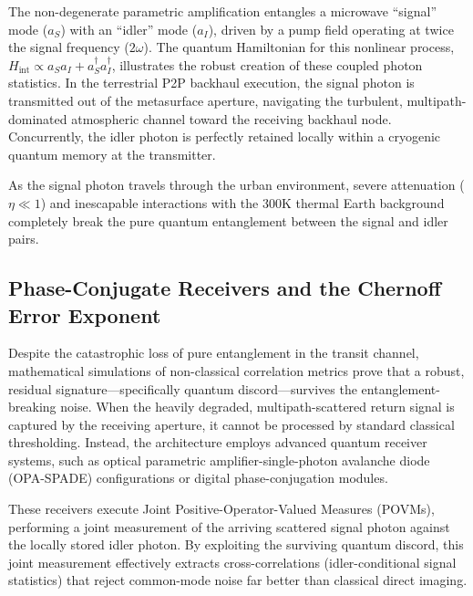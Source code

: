 \documentclass[11pt,a4paper]{article}
\begin{document}
The non-degenerate parametric amplification entangles a microwave ``signal'' mode ($a_S$) with an ``idler'' mode ($a_I$), driven by a pump field operating at twice the signal frequency ($2\omega$).\cite{ref33} The quantum Hamiltonian for this nonlinear process, $H_{\text{int}} \propto a_S a_I + a_S^\dagger a_I^\dagger$, illustrates the robust creation of these coupled photon statistics.\cite{ref33} In the terrestrial P2P backhaul execution, the signal photon is transmitted out of the metasurface aperture, navigating the turbulent, multipath-dominated atmospheric channel toward the receiving backhaul node.\cite{ref37} Concurrently, the idler photon is perfectly retained locally within a cryogenic quantum memory at the transmitter.\cite{ref36}

As the signal photon travels through the urban environment, severe attenuation ($\eta \ll 1$) and inescapable interactions with the 300K thermal Earth background completely break the pure quantum entanglement between the signal and idler pairs.\cite{ref33}

\subsection{Phase-Conjugate Receivers and the Chernoff Error Exponent}

Despite the catastrophic loss of pure entanglement in the transit channel, mathematical simulations of non-classical correlation metrics prove that a robust, residual signature---specifically quantum discord---survives the entanglement-breaking noise.\cite{ref6} When the heavily degraded, multipath-scattered return signal is captured by the receiving aperture, it cannot be processed by standard classical thresholding.\cite{ref33} Instead, the architecture employs advanced quantum receiver systems, such as optical parametric amplifier-single-photon avalanche diode (OPA-SPADE) configurations or digital phase-conjugation modules.\cite{ref33}

These receivers execute Joint Positive-Operator-Valued Measures (POVMs), performing a joint measurement of the arriving scattered signal photon against the locally stored idler photon.\cite{ref33} By exploiting the surviving quantum discord, this joint measurement effectively extracts cross-correlations (idler-conditional signal statistics) that reject common-mode noise far better than classical direct imaging.\cite{ref33}
\end{document}
